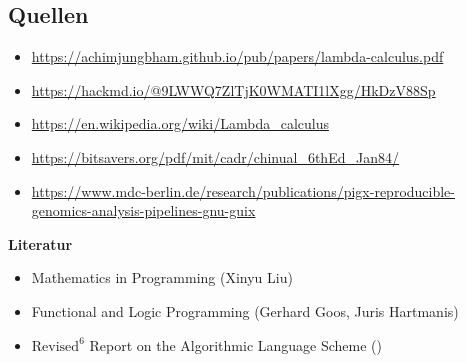 \documentclass{beamer}
\begin{document}
\begin{frame}
	\section{Quellen}
	\begin{itemize}
		\item \url{https://achimjungbham.github.io/pub/papers/lambda-calculus.pdf}
		\item  \url{https://hackmd.io/@9LWWQ7ZlTjK0WMATI1lXgg/HkDzV88Sp} %
		\item \url{https://en.wikipedia.org/wiki/Lambda_calculus}
            \item \url{https://bitsavers.org/pdf/mit/cadr/chinual_6thEd_Jan84/}
            \item \url{https://www.mdc-berlin.de/research/publications/pigx-reproducible-genomics-analysis-pipelines-gnu-guix}
	\end{itemize}
 \centering
 \textbf{Literatur}
 \begin{itemize}
     \item Mathematics
in Programming (Xinyu Liu)
\item Functional and
Logic Programming (Gerhard Goos, Juris Hartmanis)
\item $\text{Revised}^6$ Report on the Algorithmic Language
Scheme ()
 \end{itemize}
\end{frame}
\end{document}
